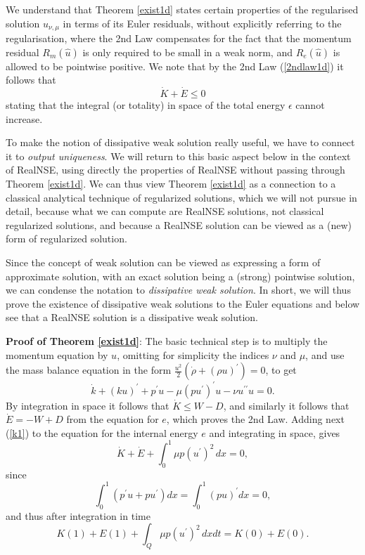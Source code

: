 We understand that Theorem \ref{exist1d} states certain 
properties of the regularised solution $u_{\nu ,\mu}$ 
in terms of its Euler residuals, without
explicitly referring to the regularisation,    
where the 2nd Law compensates for the 
fact that the momentum residual $R_m(\hat u)$ is only
required to be small in a weak norm, and $R_e(\hat u)$ is allowed
to be pointwise positive. We note that by the 2nd Law (\ref{2ndlaw1d})
it follows that
\begin{equation}\label{1stlaw}
\dot K+\dot E\le 0
\end{equation}
stating that the 
integral (or totality) in space of the total energy $\epsilon$ 
cannot increase. 

To make the notion of dissipative weak
solution really useful, we have to connect it to 
\emph{output uniqueness}. We will return to this basic aspect
below in the context of RealNSE, using directly the properties of RealNSE
without passing through Theorem \ref{exist1d}. We can thus view
Theorem \ref{exist1d} as a connection to a classical
analytical technique of regularized solutions, which we will not
pursue in detail, because what we can compute are RealNSE solutions,
not classical regularized solutions, and because a RealNSE solution can be viewed
as a (new) form of  
regularized solution.   

Since the concept of weak solution can be viewed as expressing 
a form of approximate solution, with an exact solution 
being a (strong) pointwise solution, we can condense the notation to 
\emph{dissipative weak solution}. In short, we will thus
prove the existence of dissipative weak solutions to the Euler
equations and below see that a RealNSE solution is a dissipative
weak solution.

\medskip
\noindent 
{\bf Proof of Theorem \ref{exist1d}}: 
The basic technical step is to multiply the momentum equation
by $u$, omitting for simplicity the indices $\nu$ and $\mu$,
and use the mass balance equation in the form
$\frac{u^2}{2}(\dot \rho +(\rho u)^\prime )=0$, to get
\begin{equation}\label{k1}
\dot k +(ku)^\prime +p^\prime u -\mu (pu^\prime )^\prime u-\nu u^{\prime\prime}u =0.
\end{equation}
By integration in space it follows that $\dot K\le W-D$,
and similarly it follows that $\dot E =-W+D$ from the 
equation for $e$, which proves the 2nd Law.
Adding next (\ref{k1}) to the equation for the internal energy $e$ and
integrating in space, gives
\[
\dot K+\dot E +\int_0^1 \mu p(u^\prime )^2\, dx =0,
\]
since
\[
\int_0^1 (p^\prime u + pu^\prime)dx = \int_0^1(pu)^\prime dx =0,
\] 
and thus after integration in time
\begin{equation}\label{energy1}
K(1)+E(1) +\int_Q \mu p(u^\prime )^2\, dxdt =K(0)+E(0).
\end{equation}

